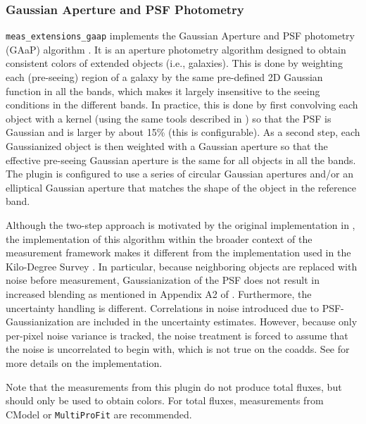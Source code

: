 \subsubsection{Gaussian Aperture and PSF Photometry}
\label{sec:gaap}

\texttt{meas\_extensions\_gaap} implements the Gaussian Aperture and PSF photometry (GAaP) algorithm \citep{2008A&A...482.1053K}.
It is an aperture photometry algorithm designed to obtain consistent colors of extended objects (i.e., galaxies).
This is done by weighting each (pre-seeing) region of a galaxy by the same pre-defined 2D Gaussian function in all the bands, which makes it largely insensitive to the seeing conditions in the different bands.
In practice, this is done by first convolving each object with a kernel (using the same tools described in ) so that the PSF is Gaussian and is larger by about 15\% (this is configurable).
As a second step, each Gaussianized object is then weighted with a Gaussian aperture so that the effective pre-seeing Gaussian aperture is the same for all objects in all the bands.
The plugin is configured to use a series of circular Gaussian apertures and/or an elliptical Gaussian aperture that matches the shape of the object in the reference band.

Although the two-step approach is motivated by the original implementation in \citet{2008A&A...482.1053K}, the implementation of this algorithm within the broader context of the measurement framework makes it different from the implementation used in the Kilo-Degree Survey \citep[KiDS;][]{2024A&A...686A.170W}.
In particular, because neighboring objects are replaced with noise before measurement, Gaussianization of the PSF does not result in increased blending as mentioned in Appendix A2 of \citet{2015MNRAS.454.3500K}.
Furthermore, the uncertainty handling is different.
Correlations in noise introduced due to PSF-Gaussianization are included in the uncertainty estimates.
However, because only per-pixel noise variance is tracked, the noise treatment is forced to assume that the noise is uncorrelated to begin with, which is not true on the coadds.
See \citet{DMTN-190} for more details on the implementation.

Note that the measurements from this plugin do not produce total fluxes, but should only be used to obtain colors.
For total fluxes, measurements from CModel  or \texttt{MultiProFit}  are recommended.
